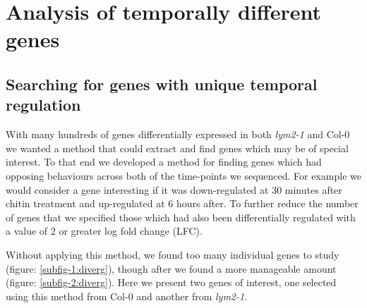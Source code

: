 \documentclass[../main.tex]{subfiles}
\begin{document}
\clearpage

\section{Analysis of temporally different genes}
\label{sec:tempexpress}

\subsection{Searching for genes with unique temporal regulation}
\label{sec:col-0-textitlym2}

With many hundreds of genes differentially expressed in both \textit{lym2-1}
and Col-0 we wanted a method that could extract and find genes which may be of
special interest. To that end we developed a method for finding genes which had
opposing behaviours across both of the time-points we sequenced. For example we
would consider a gene interesting if it was down-regulated at 30 minutes after
chitin treatment and up-regulated at 6 hours after. To further reduce the number
of genes that we specified those which had also been differentially regulated
with a value of 2 or greater log fold change (LFC).

Without applying this method, we found too many individual genes to study
(figure: \ref{subfig-1:diverg}), though after we found a more manageable amount
(figure: \ref{subfig-2:diverg}). Here we present two genes of interest, one
selected using this method from Col-0 and another from \textit{lym2-1}.
\end{document}

